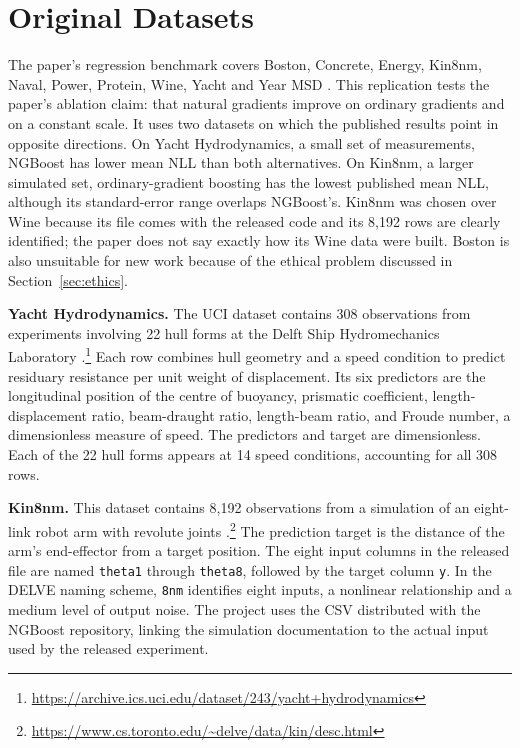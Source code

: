 \section{Original Datasets}
\label{sec:original-data}

The paper's regression benchmark covers Boston, Concrete, Energy, Kin8nm, Naval, Power, Protein, Wine, Yacht and Year MSD \cite{duan2020ngboost}.
This replication tests the paper's ablation claim: that natural gradients improve on ordinary gradients and on a constant scale.
It uses two datasets on which the published results point in opposite directions.
On Yacht Hydrodynamics, a small set of measurements, NGBoost has lower mean NLL than both alternatives.
On Kin8nm, a larger simulated set, ordinary-gradient boosting has the lowest published mean NLL, although its standard-error range overlaps NGBoost's.
Kin8nm was chosen over Wine because its file comes with the released code and its 8{,}192 rows are clearly identified; the paper does not say exactly how its Wine data were built.
Boston is also unsuitable for new work because of the ethical problem discussed in Section~\ref{sec:ethics}.

\textbf{Yacht Hydrodynamics.}
The UCI dataset contains 308 observations from experiments involving 22 hull forms at the Delft Ship Hydromechanics Laboratory \cite{uci-yacht}.\footnote{\url{https://archive.ics.uci.edu/dataset/243/yacht+hydrodynamics}}
Each row combines hull geometry and a speed condition to predict residuary resistance per unit weight of displacement.
Its six predictors are the longitudinal position of the centre of buoyancy, prismatic coefficient, length-displacement ratio, beam-draught ratio, length-beam ratio, and Froude number, a dimensionless measure of speed.
The predictors and target are dimensionless.
Each of the 22 hull forms appears at 14 speed conditions, accounting for all 308 rows.

\textbf{Kin8nm.}
This dataset contains 8{,}192 observations from a simulation of an eight-link robot arm with revolute joints \cite{delve-kin}.\footnote{\url{https://www.cs.toronto.edu/~delve/data/kin/desc.html}}
The prediction target is the distance of the arm's end-effector from a target position.
The eight input columns in the released file are named \texttt{theta1} through \texttt{theta8}, followed by the target column \texttt{y}.
In the DELVE naming scheme, \texttt{8nm} identifies eight inputs, a nonlinear relationship and a medium level of output noise.
The project uses the CSV distributed with the NGBoost repository, linking the simulation documentation to the actual input used by the released experiment.


